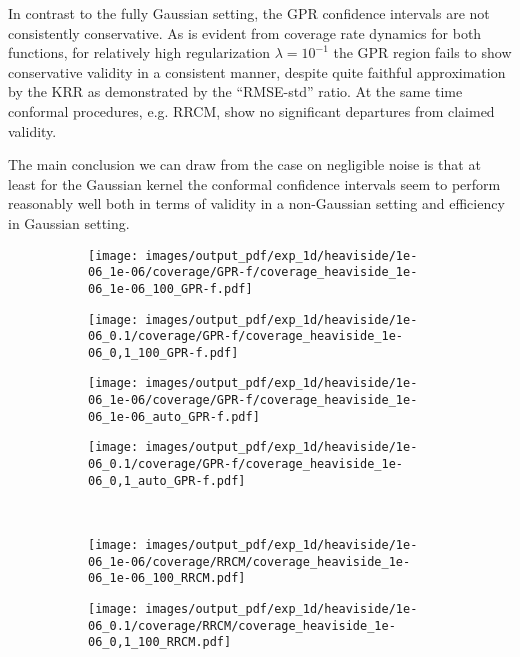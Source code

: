 \documentclass[a4paper,14pt]{extarticle}
\begin{document}
In contrast to the fully Gaussian setting, the GPR confidence intervals are not
consistently conservative. As is evident from coverage rate dynamics for both functions,
for relatively high regularization $\lambda=10^{-1}$ the GPR region fails to show
conservative validity in a consistent manner, despite quite faithful approximation
by the KRR as demonstrated by the ``RMSE-std'' ratio. At the same time conformal
procedures, e.g. RRCM, show no significant departures from claimed validity.

The main conclusion we can draw from the case on negligible noise is that at least
for the Gaussian kernel the conformal confidence intervals seem to perform reasonably
well both in terms of validity in a non-Gaussian setting and efficiency in Gaussian
setting.

\begin{figure}%
  \centering
  \begin{subfigure}[b]{0.25\linewidth}
    \texttt{[image: images/output\_pdf/exp\_1d/heaviside/1e-06\_1e-06/coverage/GPR-f/coverage\_heaviside\_1e-06\_1e-06\_100\_GPR-f.pdf]}
  \end{subfigure}%
  \begin{subfigure}[b]{0.25\linewidth}
    \texttt{[image: images/output\_pdf/exp\_1d/heaviside/1e-06\_0.1/coverage/GPR-f/coverage\_heaviside\_1e-06\_0,1\_100\_GPR-f.pdf]}
  \end{subfigure}%
  \begin{subfigure}[b]{0.25\linewidth}
    \texttt{[image: images/output\_pdf/exp\_1d/heaviside/1e-06\_1e-06/coverage/GPR-f/coverage\_heaviside\_1e-06\_1e-06\_auto\_GPR-f.pdf]}
  \end{subfigure}%
  \begin{subfigure}[b]{0.25\linewidth}
    \texttt{[image: images/output\_pdf/exp\_1d/heaviside/1e-06\_0.1/coverage/GPR-f/coverage\_heaviside\_1e-06\_0,1\_auto\_GPR-f.pdf]}
  \end{subfigure}\\
  \begin{subfigure}[b]{0.25\linewidth}
    \texttt{[image: images/output\_pdf/exp\_1d/heaviside/1e-06\_1e-06/coverage/RRCM/coverage\_heaviside\_1e-06\_1e-06\_100\_RRCM.pdf]}
  \end{subfigure}%
  \begin{subfigure}[b]{0.25\linewidth}
    \texttt{[image: images/output\_pdf/exp\_1d/heaviside/1e-06\_0.1/coverage/RRCM/coverage\_heaviside\_1e-06\_0,1\_100\_RRCM.pdf]}

\end{subfigure}
\end{figure}
\end{document}
